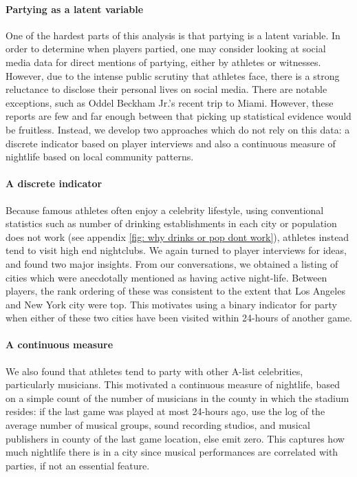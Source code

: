 \documentclass[letterpaper,12pt]{article}
\begin{document}
\paragraph{Partying as a latent variable}
One of the hardest parts of this analysis is that partying is a latent variable.
In order to determine when players partied, one may consider looking at social media data for direct mentions of partying, either by athletes or witnesses. However, due to the intense public scrutiny that athletes face, there is a strong reluctance to disclose their personal lives on social media. There are notable exceptions, such
as Oddel Beckham Jr.'s recent trip to Miami.\citep{bleler}
However, these reports are few and far enough between that picking up statistical evidence would be fruitless.
Instead, we develop two approaches which do not rely on this data: a discrete indicator 
based on player interviews and also a continuous measure of nightlife based on local community patterns.

\paragraph{A discrete indicator}
Because famous athletes often enjoy a celebrity lifestyle, using conventional statistics
such as number of drinking establishments in each city or population does not work (see appendix \ref{fig: why drinks or pop dont work}), athletes instead
tend to visit high end nightclubs. We again turned to player interviews for ideas,
and found two major insights. From our conversations, 
we obtained a listing of cities which were anecdotally
mentioned as having active night-life. Between players, the rank ordering of these
was consistent to the extent that Los Angeles and New York city were top. 
This motivates using a binary indicator for party when either of these two cities have been visited within 24-hours of another game. 

\paragraph{A continuous measure}
We also found that athletes tend to party with other A-list celebrities,
particularly musicians. This motivated a continuous measure of nightlife, based on a simple count of the number of musicians in the county in which the stadium resides: if the last game was played at most 24-hours ago, use the log of the average number
of musical groups, sound recording studios, and musical publishers in county of the 
last game location, else emit zero.  
This captures
how much nightlife there is in a city since musical performances are correlated
with parties, if not an essential feature.
\end{document}

